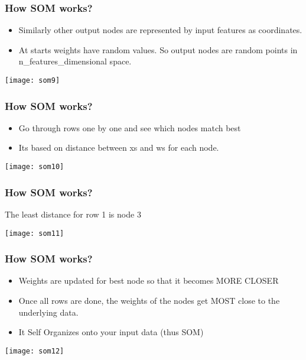 \begin{frame}[fragile] \frametitle{How SOM works?}
\begin{itemize}
\item Similarly other output nodes are represented by input features as coordinates.
\item At starts weights have random values. So output nodes are random points in n\_features\_dimensional space.
\end{itemize}
\begin{center}
\texttt{[image: som9]}
\end{center}
\end{frame}

\begin{frame}[fragile] \frametitle{How SOM works?}
\begin{itemize}
\item Go through rows one by one and see which nodes match best
\item Its based on distance between xs and ws for each node.
\end{itemize}
\begin{center}
\texttt{[image: som10]}
\end{center}
\end{frame}

\begin{frame}[fragile] \frametitle{How SOM works?}
The least distance for row 1 is node 3
\begin{center}
\texttt{[image: som11]}
\end{center}
\end{frame}

\begin{frame}[fragile] \frametitle{How SOM works?}
\begin{itemize}
\item Weights are updated for best node so that it becomes MORE CLOSER
\item Once all rows are done, the weights of the nodes get MOST close to the underlying data.
\item It Self Organizes onto your input data (thus SOM)
\end{itemize}
\begin{center}
\texttt{[image: som12]}
\end{center}
\end{frame}

